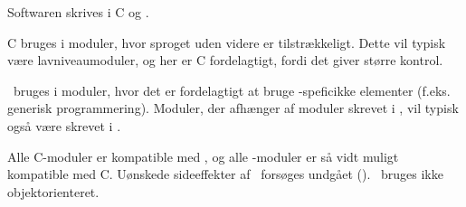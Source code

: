 Softwaren skrives i C og \Cpp.

C bruges i moduler, hvor sproget uden videre er tilstrækkeligt. Dette
vil typisk være lavniveaumoduler, og her er C fordelagtigt, fordi det
giver større kontrol.

\Cpp\ bruges i moduler, hvor det er fordelagtigt at bruge
\Cpp-speficikke elementer (f.eks. generisk programmering). Moduler, der afhænger af moduler skrevet i \Cpp, vil
typisk også være skrevet i \Cpp.

Alle C-moduler er kompatible med \Cpp, og alle \Cpp-moduler er så vidt
muligt kompatible med C. Uønskede sideeffekter af \Cpp\ forsøges
undgået (). \Cpp\ bruges ikke objektorienteret.



